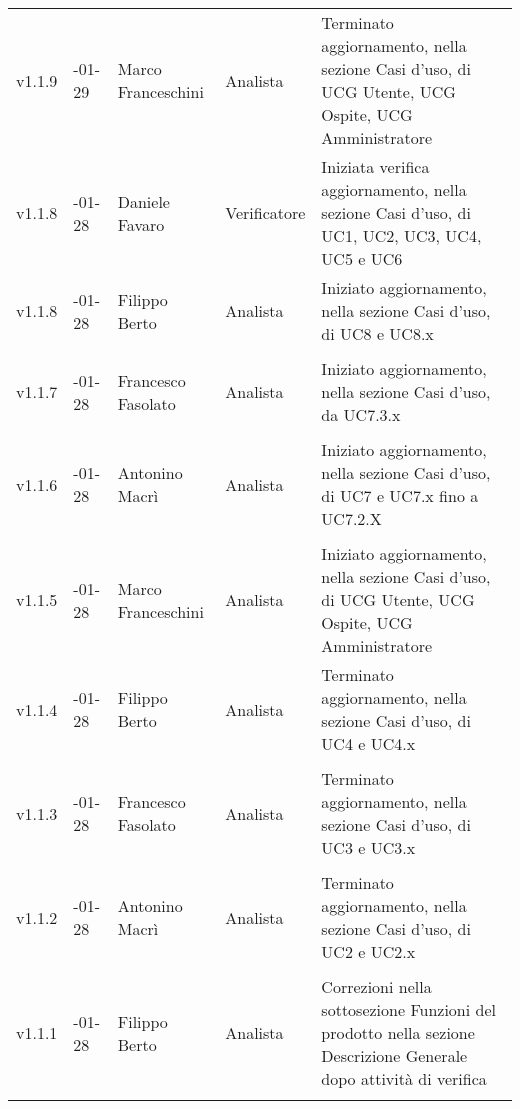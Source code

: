 \begin{longtable} { >{\centering}p{1.4cm} >{\centering}p{2cm} >{\centering}p{2.3cm} >{\centering}p{2.7cm} p{5.5cm} }
		\addlinespace[0.4em]
		\midrule
		\addlinespace[0.4em]
		v1.1.9 & 2017-01-29 & Marco Franceschini & Analista & Terminato aggiornamento, nella sezione Casi d'uso, di UCG Utente, UCG Ospite, UCG Amministratore \\
		\addlinespace[0.4em]
		\midrule
		\addlinespace[0.4em]
		v1.1.8 & 2017-01-28 & Daniele Favaro & Verificatore & Iniziata verifica aggiornamento, nella sezione Casi d'uso, di UC1, UC2, UC3, UC4, UC5 e UC6 \\
		\addlinespace[0.4em]
		\midrule
		\addlinespace[0.4em]
		v1.1.8 & 2017-01-28 & Filippo Berto & Analista & Iniziato aggiornamento, nella sezione Casi d'uso, di UC8 e UC8.x \\ \\
		\addlinespace[0.4em]
		\midrule
		\addlinespace[0.4em]
		v1.1.7 & 2017-01-28 & Francesco Fasolato & Analista & Iniziato aggiornamento, nella sezione Casi d'uso, da UC7.3.x\\ \\
		\addlinespace[0.4em]
		\midrule
		\addlinespace[0.4em]
		v1.1.6 & 2017-01-28 & Antonino Macrì & Analista & Iniziato aggiornamento, nella sezione Casi d'uso, di UC7 e UC7.x fino a UC7.2.X \\ \\
		\addlinespace[0.4em]
		\midrule
		\addlinespace[0.4em]
		v1.1.5 & 2017-01-28 & Marco Franceschini & Analista & Iniziato aggiornamento, nella sezione Casi d'uso, di UCG Utente, UCG Ospite, UCG Amministratore \\ 
		\addlinespace[0.4em]
		\midrule
		\addlinespace[0.4em]
		v1.1.4 & 2017-01-28 & Filippo Berto & Analista & Terminato aggiornamento, nella sezione Casi d'uso, di UC4 e UC4.x \\ \\
		\addlinespace[0.4em]
		\midrule
		\addlinespace[0.4em]
		v1.1.3 & 2017-01-28 & Francesco Fasolato & Analista & Terminato aggiornamento, nella sezione Casi d'uso, di UC3 e UC3.x \\ \\
		\addlinespace[0.4em]
		\midrule
		\addlinespace[0.4em]
		v1.1.2 & 2017-01-28 & Antonino Macrì & Analista & Terminato aggiornamento, nella sezione Casi d'uso, di UC2 e UC2.x \\ \\
		\addlinespace[0.4em]
		\midrule
		\addlinespace[0.4em]
		v1.1.1 & 2017-01-28 & Filippo Berto & Analista & Correzioni nella sottosezione Funzioni del prodotto nella sezione Descrizione Generale dopo attività di verifica \\ 
		\addlinespace[0.4em]

\end{longtable}
